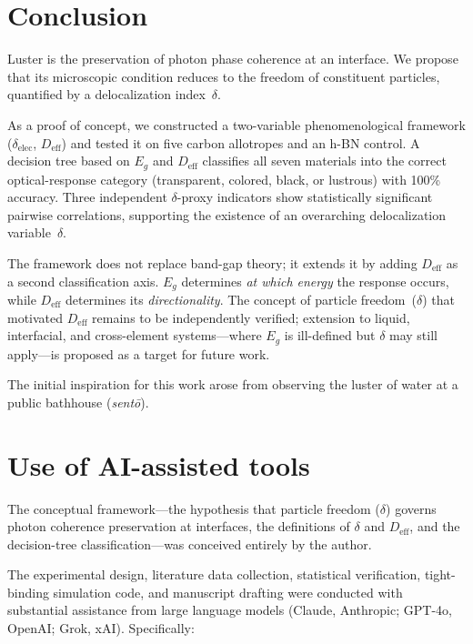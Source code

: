 \documentclass[twocolumn,showpacs,preprintnumbers,amsmath,amssymb,prb]{revtex4-2}
\begin{document}
\section{Conclusion}
\label{sec:conclusion}

Luster is the preservation of photon phase coherence at an interface.
We propose that its microscopic condition reduces to the freedom of
constituent particles, quantified by a delocalization index~$\delta$.

As a proof of concept, we constructed a two-variable phenomenological
framework ($\delta_\mathrm{elec}$, $D_\mathrm{eff}$) and tested it on
five carbon allotropes and an h-BN control. A decision tree based on
$E_g$ and $D_\mathrm{eff}$ classifies all seven materials into the
correct optical-response category (transparent, colored, black, or
lustrous) with 100\% accuracy. Three independent $\delta$-proxy
indicators show statistically significant pairwise correlations,
supporting the existence of an overarching delocalization
variable~$\delta$.

The framework does not replace band-gap theory; it extends it by
adding $D_\mathrm{eff}$ as a second classification axis.
$E_g$ determines \emph{at which energy} the response occurs, while
$D_\mathrm{eff}$ determines its \emph{directionality}. The concept of
particle freedom~($\delta$) that motivated $D_\mathrm{eff}$ remains to
be independently verified; extension to liquid, interfacial, and
cross-element systems---where $E_g$ is ill-defined but $\delta$ may
still apply---is proposed as a target for future work.

\begin{acknowledgments}
The initial inspiration for this work arose from observing the luster
of water at a public bathhouse (\textit{sent\=o}).
\end{acknowledgments}

\section*{Use of AI-assisted tools}

The conceptual framework---the hypothesis that particle freedom
($\delta$) governs photon coherence preservation at interfaces, the
definitions of $\delta$ and $D_\mathrm{eff}$, and the decision-tree
classification---was conceived entirely by the author.

The experimental design, literature data collection, statistical
verification, tight-binding simulation code, and manuscript drafting
were conducted with substantial assistance from large language models
(Claude, Anthropic; GPT-4o, OpenAI; Grok, xAI). Specifically:
\end{document}
